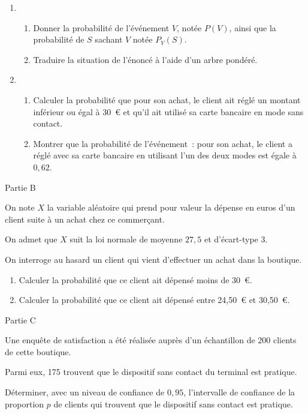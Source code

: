 \bigskip
\begin{enumerate}
     \item
     \begin{enumerate}[label=\alph*.]
          \item Donner la probabilité de l'événement $V$, notée $P(V)$, ainsi que la probabilité de $S$ sachant
          $V$ notée $P_V(S)$.
          \item Traduire la situation de l'énoncé à l'aide d'un arbre pondéré.
     \end{enumerate}
     \item
     \begin{enumerate}[label=\alph*.]
          \item Calculer la probabilité que pour son achat, le client ait réglé un montant inférieur ou égal à
          30~\euro{} et qu'il ait utilisé sa carte bancaire en mode sans contact.
          \item Montrer que la probabilité de l'événement~: \og pour son achat, le client a réglé avec sa carte
          bancaire en utilisant l'un des deux modes\fg{} est égale à $0,62$.
     \end{enumerate}
\end{enumerate}
\begin{center}\begin{h3}Partie B \end{h3}\end{center}
On note $X$ la variable aléatoire qui prend pour valeur la dépense en euros d'un client suite à un
achat chez ce commerçant.
\par
On admet que $X$ suit la loi normale de moyenne $27,5$ et d'écart-type $3$.
\par
On interroge au hasard un client qui vient d'effectuer un achat dans la boutique.
\medskip
\begin{enumerate}
     \item Calculer la probabilité que ce client ait dépensé moins de 30~\euro.
     \item Calculer la probabilité que ce client ait dépensé entre 24,50~\euro{} et 30,50~\euro.
\end{enumerate}
\begin{center}\begin{h3}Partie C \end{h3}\end{center}
Une enquête de satisfaction a été réalisée auprès d'un échantillon de $200$ clients de cette boutique.
\par
Parmi eux, 175 trouvent que le dispositif sans contact du terminal est pratique.
\par
Déterminer, avec un niveau de confiance de $0,95$, l'intervalle de confiance de la proportion $p$ de
clients qui trouvent que le dispositif sans contact est pratique.
\par
